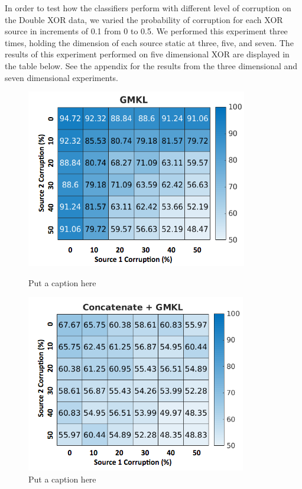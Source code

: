 \documentclass{article}
\begin{document}
In order to test how the classifiers perform with different level of corruption on the Double XOR data, we varied the probability of corruption for each XOR source in increments of 0.1 from 0 to 0.5. We performed this experiment three times, holding the dimension of each source static at three, five, and seven. The results of this experiment performed on five dimensional XOR are displayed in the table below. See the appendix for the results from the three dimensional and seven dimensional experiments.


\begin{figure}
\begin{minipage}{.5\textwidth}
    \centering
    \includegraphics[width=\textwidth]{dxor_heat_gmkl.png}
    \caption{Put a caption here}
    \label{fig:dxor_heat_gmkl}
\end{minipage}
\begin{minipage}{.5\textwidth}
    \centering
    \includegraphics[width=\textwidth]{dxor_heat_conc.png}
    \caption{Put a caption here}
    \label{fig:dxor_heat_conc}
\end{minipage}
\end{figure}
\end{document}
